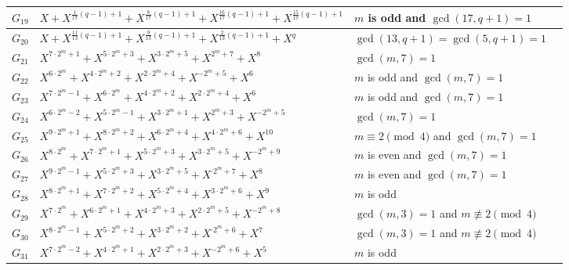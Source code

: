 \documentclass[12pt]{amsart}
\numberwithin{equation}{section}
\theoremstyle{definition}
\begin{document}
\begin{longtable}{|m{2em}|m{21em}|m{9em}|m{2em}|}
\hline
$G_{19}$& $X+X^{\frac{1}{17}(q-1)+1}+X^{\frac{8}{17}(q-1)+1}+ X^{\frac{16}{17}(q-1)+1}+X^{\frac{15}{17}(q-1)+1}$ & $m$ is odd and $\gcd(17,q+1)=1$  & \cite{Zhang_penta_23} \\
\hline
$G_{20}$& $X+X^{\frac{11}{13}(q-1)+1}+X^{\frac{9}{13}(q-1)+1}+ X^{\frac{2}{13}(q-1)+1}+X^{q}$ & $\gcd(13,q+1)=\gcd(5,q+1)=1$  & \cite{Zhang_penta_23}\\
\hline
$G_{21}$& $X^{7 \cdot 2^m+1} + X^{5 \cdot 2^m+3} + X^{3 \cdot 2^m+5} + X^{2^m+7} + X^{8}$ & $\gcd(m,7)=1$ & \cite{QLiu_penta_2023}\\
\hline
$G_{22}$& $X^{6 \cdot 2^m} + X^{4 \cdot 2^m+2} + X^{2 \cdot 2^m+4} + X^{-2^m+5} + X^{6}$ & $m$ is odd and $\gcd(m,7)=1$ & \cite{QLiu_penta_2023} \\
\hline
$G_{23}$& $X^{7 \cdot 2^m-1} + X^{6 \cdot 2^m} + X^{4 \cdot 2^m+2} + X^{2\cdot 2^m+4} + X^{6}$ & $m$ is odd and $\gcd(m,7)=1$ & \cite{QLiu_penta_2023}\\
\hline
$G_{24}$& $X^{6 \cdot 2^m-2} + X^{5 \cdot 2^m-1} + X^{3 \cdot 2^m+1} + X^{2^m+3} + X^{-2^m+5}$ & $\gcd(m,7)=1$ & \cite{QLiu_penta_2023}\\
\hline
$G_{25}$& $X^{9 \cdot 2^m+1} + X^{8 \cdot 2^m+2} + X^{6 \cdot 2^m+4} + X^{4\cdot 2^m+6} + X^{10}$ & $m \equiv 2 \pmod 4$ and $\gcd(m,7)=1$ & \cite{QLiu_penta_2023}\\
\hline
$G_{26}$& $X^{8 \cdot 2^m} + X^{7 \cdot 2^m+1} + X^{5 \cdot 2^m+3} + X^{3\cdot 2^m+5} + X^{-2^m+9}$ & $m $ is even and $\gcd(m,7)=1$ & \cite{QLiu_penta_2023}\\
\hline
$G_{27}$& $X^{9 \cdot 2^m-1} + X^{5 \cdot 2^m+3} + X^{3 \cdot 2^m+5} + X^{\cdot 2^m+7} + X^{8}$ & $m $ is even and $\gcd(m,7)=1$ & \cite{QLiu_penta_2023}\\
\hline
$G_{28}$& $X^{8 \cdot 2^m+1} + X^{7 \cdot 2^m+2} + X^{5 \cdot 2^m+4} + X^{3\cdot 2^m+6} + X^{9}$ & $m $ is odd & \cite{QLiu_penta_2023} \\
\hline
$G_{29}$& $X^{7 \cdot 2^m} + X^{6 \cdot 2^m+1} + X^{4 \cdot 2^m+3} + X^{2\cdot 2^m+5} + X^{-2^m+8}$ &  $\gcd(m,3)=1$ and $m \not \equiv 2 \pmod 4$& \cite{QLiu_penta_2023}\\
\hline
$G_{30}$& $X^{8 \cdot 2^m-1} + X^{5 \cdot 2^m+2} + X^{3 \cdot 2^m+2} + X^{\cdot 2^m+6} + X^{7}$ &  $\gcd(m,3)=1$ and $m \not \equiv 2 \pmod 4$& \cite{QLiu_penta_2023}\\
\hline
$G_{31}$& $X^{7 \cdot 2^m-2} + X^{4 \cdot 2^m+1} + X^{2 \cdot 2^m+3} + X^{- 2^m+6} + X^{5}$ &  $m$ is odd &\cite{QLiu_penta_2023} \\

\end{longtable}
\end{document}
